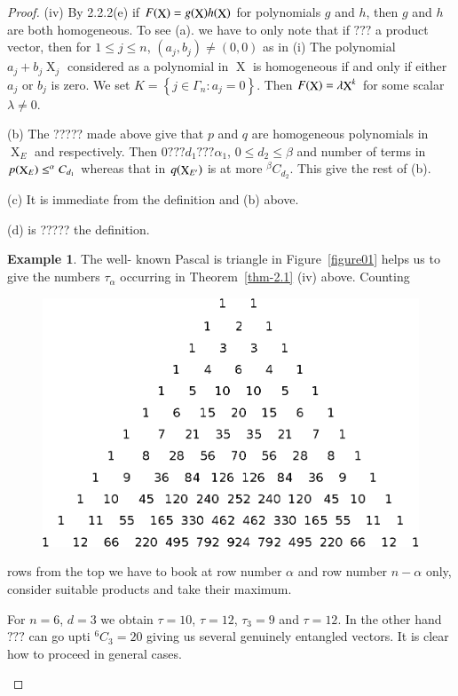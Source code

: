 \documentclass[a4paper,12pt]{article}
\DeclareMathOperator{\x}{\mathrm{X}}
\theoremstyle{definition}
\theoremstyle{underlinethm}
\newtheorem{example}{Example}[section]
\theoremstyle{definition}
\begin{document}
\begin{proof}
  (iv) By 2.2.2(e) if $F(\bold{\x})= g(\bold{\x}) h(\bold{\x})$ for polynomials $g$ and $h$, then $g$ and $h$ are both homogeneous. To see (a). we have to only note that if $???$ a product vector, then for $1 \leq j \leq n$, $(a_{j}, b_{j}) \neq (0,0)$ as in (i) The polynomial $a_{j} + b_{j} \x_{j}$ considered as a polynomial in $\x$ is homogeneous if and only if either $a_{j}$ or $b_{j}$ is zero. We set $K = \left\{ j \in \Gamma_{n} : a_{j} = 0\right\}$. Then $F(\bold{\x}) = \lambda\bold{\x}^{k}$ for some scalar $\lambda \neq 0$.
  
  (b) The ????? made above give that $p$ and $q$ are homogeneous polynomials in $\x_{E}$ and respectively. Then  $0 ??? d_{1} ??? \alpha_{1}$, $0 \leq d_{2} \leq \beta $ and number of terms in $p(\bold{\x}_{E}) \leq ^{\alpha}C_{d_{1}}$  whereas that in $q(\bold{\x}_{E'})$ is at more $^{\beta}C_{d_{2}}$. This give the rest of (b).
  
  (c) It is immediate from the definition and (b) above.
  
  (d) is ????? the definition.
 
 \begin{example}\label{example-2.1}
The well- known Pascal is triangle in Figure~\ref{figure01} helps us to give the numbers $\tau_{\alpha}$ occurring in Theorem~\ref{thm-2.1} (iv) above. Counting 

\begin{figure}[h]
\centering
\includegraphics[scale=.8]{figure/fig1.eps}
\caption{}\label{fig01}
\end{figure}

rows from the top we have to book at row number $\alpha$ and row number $n-\alpha$ only, consider suitable products and take their maximum.

For $n=6$, $d=3$ we obtain $\tau = 10$, $\tau = 12$, $\tau_{3} = 9$ and $\tau = 12$. In the other hand $???$ can go upti $^6C_{3} = 20$ giving us several genuinely entangled vectors. It is clear how to proceed in general cases.
\end{example}
\end{proof}
\end{document}
